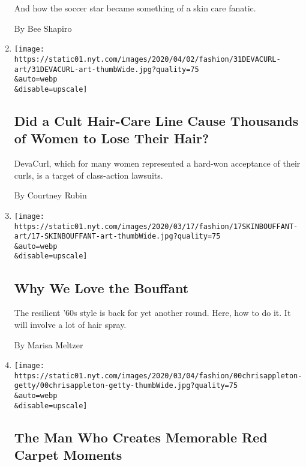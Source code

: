 \begin{enumerate}
  And how the soccer star became something of a skin care fanatic.

  By Bee Shapiro
\item
  \href{/2020/04/01/style/deva-curl-hair-loss.html}{}

  \texttt{[image: https://static01.nyt.com/images/2020/04/02/fashion/31DEVACURL-art/31DEVACURL-art-thumbWide.jpg?quality=75\\\&auto=webp\\\&disable=upscale]}

  \hypertarget{did-a-cult-hair-care-line-cause-thousands-of-women-to-lose-their-hair}{%
  \subsection{Did a Cult Hair-Care Line Cause Thousands of Women to Lose
  Their
  Hair?}\label{did-a-cult-hair-care-line-cause-thousands-of-women-to-lose-their-hair}}

  DevaCurl, which for many women represented a hard-won acceptance of
  their curls, is a target of class-action lawsuits.

  By Courtney Rubin
\item
  \href{/2020/03/17/style/why-we-love-the-bouffant.html}{}

  \texttt{[image: https://static01.nyt.com/images/2020/03/17/fashion/17SKINBOUFFANT-art/17-SKINBOUFFANT-art-thumbWide.jpg?quality=75\\\&auto=webp\\\&disable=upscale]}

  \hypertarget{why-we-love-the-bouffant}{%
  \subsection{Why We Love the Bouffant}\label{why-we-love-the-bouffant}}

  The resilient '60s style is back for yet another round. Here, how to
  do it. It will involve a lot of hair spray.

  By Marisa Meltzer
\item
  \href{/2020/02/22/style/chris-appleton-hair-jennifer-lopez-the-man-who-creates-memorable-red-carpet-moments-.html}{}

  \texttt{[image: https://static01.nyt.com/images/2020/03/04/fashion/00chrisappleton-getty/00chrisappleton-getty-thumbWide.jpg?quality=75\\\&auto=webp\\\&disable=upscale]}

  \hypertarget{the-man-who-creates-memorable-red-carpet-moments}{%
  \subsection{The Man Who Creates Memorable Red Carpet
  Moments}\label{the-man-who-creates-memorable-red-carpet-moments}}


\end{enumerate}
